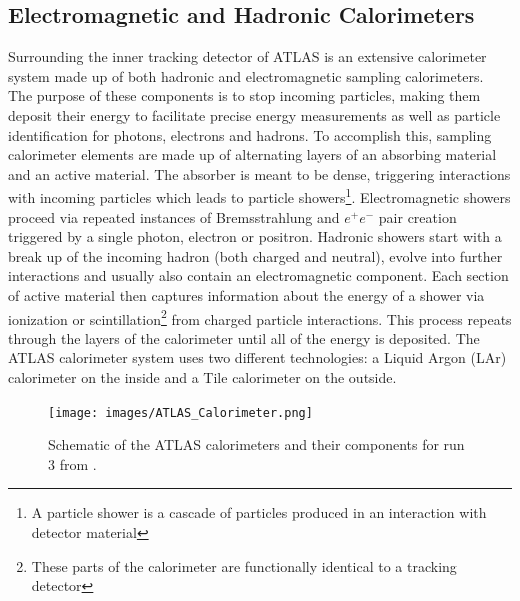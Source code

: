 \subsection{Electromagnetic and Hadronic Calorimeters}

Surrounding the inner tracking detector of ATLAS is an extensive calorimeter system made up of both hadronic and 
electromagnetic sampling calorimeters. The purpose of these components is to stop incoming particles, making them 
deposit their energy to facilitate precise energy measurements as well as particle identification for photons, 
electrons and hadrons. To accomplish this, sampling calorimeter elements are made up of alternating layers of an 
absorbing material and an active material. The absorber is meant to be dense, triggering interactions with incoming 
particles which leads to particle showers\footnote{A particle shower is a cascade of particles produced in an 
interaction with detector material}. Electromagnetic showers proceed via repeated instances of Bremsstrahlung and 
$e^+e^-$ pair creation triggered by a single photon, electron or positron. Hadronic showers start with a break up of 
the incoming hadron (both charged and neutral), evolve into further interactions and usually also contain an 
electromagnetic component. Each section of active material then captures information about the energy of a shower 
via ionization or scintillation\footnote{These parts of the calorimeter are functionally identical to a tracking 
detector} from charged particle interactions. This process repeats through the layers of the calorimeter until all of 
the energy is deposited. The ATLAS calorimeter system uses two different technologies: a Liquid Argon (LAr) 
calorimeter on the inside and a Tile calorimeter on the outside. \par

\begin{figure}
\centering
    \texttt{[image: images/ATLAS\_Calorimeter.png]}
    \caption{Schematic of the ATLAS calorimeters and their components for run 3 from \cite{atlas-run3-setup}.}
    \label{fig:ATLAS_Calorimeter}
\end{figure}

